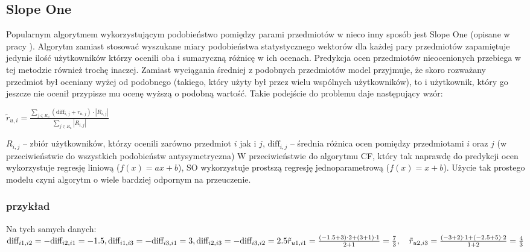\documentclass{pracamgr}
\begin{document}
   \subsection{Slope One}
    Popularnym algorytmem wykorzystującym podobieństwo pomiędzy parami przedmiotów w nieco inny sposób jest Slope One (opisane w pracy \cite{SO}).
    Algorytm zamiast stosować wyszukane miary podobieństwa statystycznego wektorów dla każdej pary przedmiotów zapamiętuje jedynie ilość
    użytkowników którzy ocenili oba i sumaryczną różnicę w ich ocenach.\newline
    Predykcja ocen przedmiotów nieocenionych przebiega w tej metodzie również trochę inaczej.
    Zamiast wyciągania średniej z podobnych przedmiotów model przyjmuje,
    że skoro rozważany przedmiot był oceniany wyżej od podobnego (takiego, który użyty był przez wielu wspólnych użytkowników),
    to i użytkownik, który go jeszcze nie ocenił przypisze mu ocenę wyższą o podobną wartość.
    Takie podejście do problemu daje następujący wzór:\newline
    \begin{center}
     $\tilde{r}_{u,i}=\frac{\sum\limits_{j\in R_u}(\text{diff}_{i,j}+r_{u,j})\cdot|R_{i,j}|}{\sum\limits_{j\in R_u}|R_{i,j}|}$
    \end{center}
    {\scriptsize
     $R_{i,j}$ -- zbiór użytkowników, którzy ocenili zarówno przedmiot $i$ jak i $j$,\newline
     $\text{diff}_{i,j}$ -- średnia różnica ocen pomiędzy przedmiotami $i$ oraz $j$ (w przeciwieństwie do wszystkich podobieństw antysymetryczna)
    }\newline
    W przeciwieństwie do algorytmu CF, który tak naprawdę do predykcji ocen wykorzystuje regresję liniową ($f(x)=ax+b$),
    SO wykorzystuje prostszą regresję jednoparametrową ($f(x)=x+b$). Użycie tak prostego modelu czyni algorytm o wiele bardziej odpornym na przeuczenie.
    \subsubsection{przykład}
     Na tych samych danych:\newline
     $\text{diff}_{i1,i2}=-\text{diff}_{i2,i1}=-1.5,\text{diff}_{i1,i3}=-\text{diff}_{i3,i1}=3,
     \text{diff}_{i2,i3}=-\text{diff}_{i3,i2}=2.5\newline
     \tilde{r}_{u1,i1}=\frac{(-1.5+3)\cdot2+(3+1)\cdot1}{2+1}=\frac{7}{3},\quad
     \tilde{r}_{u2,i3}=\frac{(-3+2)\cdot1+(-2.5+5)\cdot2}{1+2}=\frac{4}{3}
     $
\end{document}
